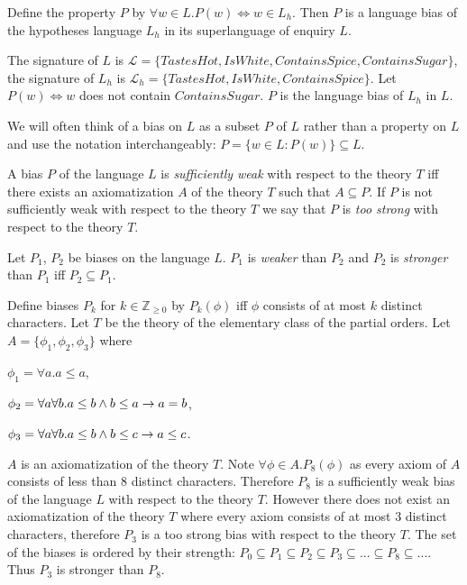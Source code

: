 \begin{exmp}
Define the property $P$ by $\forall w \in L. P(w) \iff w \in L_h$. Then $P$ is a language bias of the hypotheses language $L_h$ in its superlanguage of enquiry $L$.
\end{exmp}

\begin{exmp}
The signature of $L$ is
$\mathcal{L}=\{TastesHot, IsWhite, ContainsSpice, ContainsSugar\}$,
the signature of $L_h$ is
$\mathcal{L}_h=\{TastesHot, IsWhite, ContainsSpice\}$.
Let $P(w) \iff w$ does not contain $ContainsSugar$. $P$ is the language bias of $L_h$ in $L$.
\end{exmp}

\begin{remark}
We will often think of a bias on $L$ as a subset $P$ of $L$ rather than a property on $L$ and use the notation interchangeably:
$P=\{w \in L : P(w)\} \subseteq L$.
\end{remark}

\begin{defn}
A bias $P$ of the language $L$ is \emph{sufficiently weak} with respect to the theory $T$ iff there exists an axiomatization $A$ of the theory $T$ such that $A \subseteq P$. If $P$ is not sufficiently weak with respect to the theory $T$ we say that $P$ is \emph{too strong} with respect to the theory $T$.
\end{defn}

\begin{defn}
Let $P_1$, $P_2$ be biases on the language $L$. $P_1$ is \emph{weaker} than $P_2$ and $P_2$ is \emph{stronger} than $P_1$ iff $P_2 \subseteq P_1$.
\end{defn}

\begin{exmp}
Define biases $P_k$ for $k \in \mathbb{Z}_{\ge 0}$ by $P_k(\phi)$ iff $\phi$ consists of at most $k$ distinct characters. Let $T$ be the theory of the elementary class of the partial orders. Let $A=\{\phi_1, \phi_2, \phi_3\}$ where

$\phi_1=\forall a. a \le a$,

$\phi_2=\forall a \forall b. a \le b \wedge b \le a \to a=b$,

$\phi_3=\forall a \forall b. a \le b \wedge b \le c \to a \le c$.

$A$ is an axiomatization of the theory $T$. Note $\forall \phi \in A. P_8(\phi)$ as every axiom of $A$ consists of less than $8$ distinct characters. Therefore $P_8$ is a sufficiently weak bias of the language $L$ with respect to the theory $T$. However there does not exist an axiomatization of the theory $T$ where every axiom consists of at most $3$ distinct characters, therefore $P_3$ is a too strong bias with respect to the theory $T$. The set of the biases is ordered by their strength:
$P_0 \subseteq P_1 \subseteq P_2 \subseteq P_3 \subseteq ... \subseteq P_8 \subseteq ...$. Thus $P_3$ is stronger than $P_8$.
\end{exmp}

